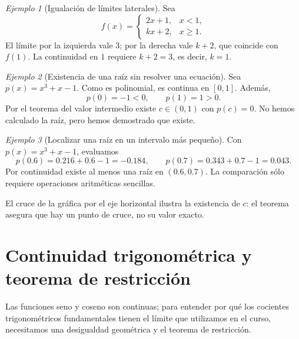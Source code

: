 \documentclass[12pt]{article}
\theoremstyle{remark}
\newtheorem{ejemplo}{Ejemplo}
\begin{document}
\begin{ejemplo}[Igualación de límites laterales]
Sea
\[
f(x)=\begin{cases}
2x+1,&x<1,\\kx+2,&x\ge1.
\end{cases}
\]
El límite por la izquierda vale $3$; por la derecha vale $k+2$, que coincide con $f(1)$. La continuidad en $1$ requiere $k+2=3$, es decir, $\boxed{k=1}$.
\end{ejemplo}


\begin{ejemplo}[Existencia de una raíz sin resolver una ecuación]
Sea $p(x)=x^3+x-1$. Como es polinomial, es continua en $[0,1]$. Además,
\[
 p(0)=-1<0,\qquad p(1)=1>0.
\]
Por el teorema del valor intermedio existe $c\in(0,1)$ con $p(c)=0$. No hemos calculado la raíz, pero hemos demostrado que existe.
\end{ejemplo}

\begin{ejemplo}[Localizar una raíz en un intervalo más pequeño]
Con $p(x)=x^3+x-1$, evaluamos
\[
 p(0.6)=0.216+0.6-1=-0.184,\qquad
 p(0.7)=0.343+0.7-1=0.043.
\]
Por continuidad existe al menos una raíz en $(0.6,0.7)$. La comparación sólo requiere operaciones aritméticas sencillas.
\end{ejemplo}

\begin{center}
\end{center}
El cruce de la gráfica por el eje horizontal ilustra la existencia de $c$: el teorema asegura que hay un punto de cruce, no su valor exacto.

\section{Continuidad trigonométrica y teorema de restricción}
Las funciones seno y coseno son continuas; para entender por qué los cocientes trigonométricos fundamentales tienen el límite que utilizamos en el curso, necesitamos una desigualdad geométrica y el teorema de restricción.
\end{document}
